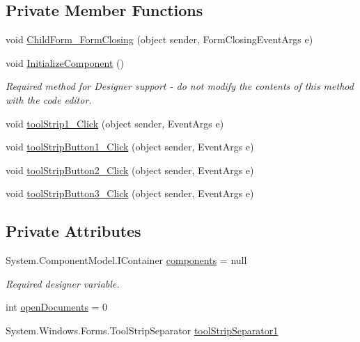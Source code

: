 \subsection*{Private Member Functions}
\begin{DoxyCompactItemize}
\item 
void \hyperlink{class__7___doroshenko__forms2__is52_1_1_task__3_ace6c91c6e530342182ff7dea0bc29b68}{Child\+Form\+\_\+\+Form\+Closing} (object sender, Form\+Closing\+Event\+Args e)
\item 
void \hyperlink{class__7___doroshenko__forms2__is52_1_1_task__3_aa9d7c9bafe9f8493f86e81275d91f706}{Initialize\+Component} ()
\begin{DoxyCompactList}\small\item\em Required method for Designer support -\/ do not modify the contents of this method with the code editor. \end{DoxyCompactList}\item 
void \hyperlink{class__7___doroshenko__forms2__is52_1_1_task__3_a2dd10c4b2313efa2c028a589b73db176}{tool\+Strip1\+\_\+\+Click} (object sender, Event\+Args e)
\item 
void \hyperlink{class__7___doroshenko__forms2__is52_1_1_task__3_aaecbab376c02299c5fa94fbc39072759}{tool\+Strip\+Button1\+\_\+\+Click} (object sender, Event\+Args e)
\item 
void \hyperlink{class__7___doroshenko__forms2__is52_1_1_task__3_afe243424d82afcfa1257f933e7e0017c}{tool\+Strip\+Button2\+\_\+\+Click} (object sender, Event\+Args e)
\item 
void \hyperlink{class__7___doroshenko__forms2__is52_1_1_task__3_ac6fdfc533df728ff11be054ad2008c84}{tool\+Strip\+Button3\+\_\+\+Click} (object sender, Event\+Args e)
\end{DoxyCompactItemize}
\subsection*{Private Attributes}
\begin{DoxyCompactItemize}
\item 
System.\+Component\+Model.\+I\+Container \hyperlink{class__7___doroshenko__forms2__is52_1_1_task__3_a9ff5b9c850cb6a608894c128200e7fca}{components} = null
\begin{DoxyCompactList}\small\item\em Required designer variable. \end{DoxyCompactList}\item 
int \hyperlink{class__7___doroshenko__forms2__is52_1_1_task__3_aeedac9b178424a006db0a447fab80f81}{open\+Documents} = 0
\item 
System.\+Windows.\+Forms.\+Tool\+Strip\+Separator \hyperlink{class__7___doroshenko__forms2__is52_1_1_task__3_a76bb1982fc89d07002bd756087639c6f}{tool\+Strip\+Separator1}
\end{DoxyCompactItemize}


